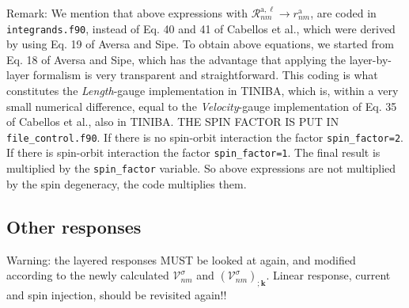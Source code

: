 {\color{red} Remark:} We mention that above expressions with 
$\mathcal{R}^{\mathrm{a},\ell}_{nm}\to r^\mathrm{a}_{nm}$, are coded in
\verb=integrands.f90=, instead of Eq. 40 and 41 of Cabellos et
al.\cite{cabellosPRB09}, which were derived by using Eq. 19 of Aversa
and Sipe.\cite{aversaPRB95} To obtain above equations, we started
from Eq. 18 of Aversa and Sipe,\cite{aversaPRB95} which has the
advantage that applying the layer-by-layer formalism is very
transparent and straightforward. This coding is what constitutes the
\emph{Length}-gauge implementation in TINIBA, which is, within a very
small numerical difference, equal to the \emph{Velocity}-gauge
implementation of Eq. 35 of Cabellos et al.\cite{cabellosPRB09}, also
in TINIBA. 
{\color{red} THE SPIN FACTOR IS PUT IN
}\verb=file_control.f90=. 
If there is no spin-orbit interaction the 
factor \verb+spin_factor=2+.  
If there is spin-orbit interaction the 
factor \verb+spin_factor=1+. The final result is multiplied by  
the \verb=spin_factor= variable. So above expressions are not
multiplied by the spin degeneracy, the code multiplies them. 



\subsection{Other responses}

{\color{red} Warning: the layered responses MUST be looked at
  again, and modified according to the newly calculated 
$\boldsymbol{\mathcal{V}}^\sigma_{nm}$  and
$(\boldsymbol{\mathcal{V}}^\sigma_{nm})_{;\mathbf{k}}$. Linear response, current and
spin injection, should be revisited again!!}
 
